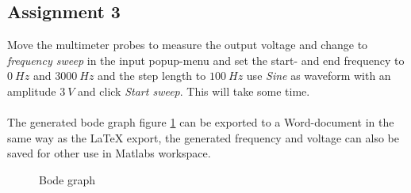 \subsection{Assignment 3}
Move the multimeter probes to measure the output voltage and change to \emph{frequency sweep} in the input popup-menu and set the start- and end frequency to $0~Hz$ and $3000~Hz$ and the step length to $100~Hz$ use \emph{Sine} as waveform with an amplitude $3~V$ and click \emph{Start sweep}. This will take some time.\\
\\
The generated bode graph figure \ref{bode} can be exported to a Word-document in the same way as the LaTeX export, the generated frequency and voltage can also be saved for other use in Matlabs workspace. 
	\begin{figure}[H]
	\centering
		\caption{Bode graph}
		\label{bode}
	\end{figure}   

\ifdefined\master
\else
	
\fi
